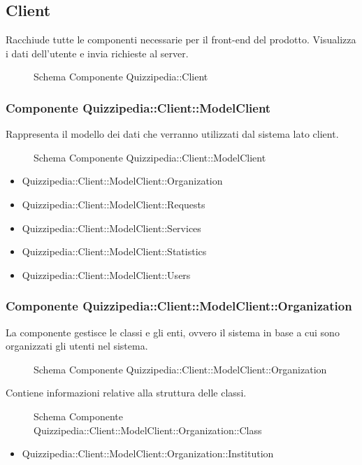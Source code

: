 \subsection{Client}
Racchiude tutte le componenti necessarie per il front-end del prodotto. Visualizza i dati dell'utente e invia richieste al server.
\begin{figure}[H]
\centering
\noindent{}
\caption{Schema Componente Quizzipedia::Client}
\end{figure}
\subsubsection{Componente Quizzipedia::Client::ModelClient}
Rappresenta il modello dei dati che verranno utilizzati dal sistema lato client.
\begin{figure}[H]
\centering
\noindent{}
\caption{Schema Componente Quizzipedia::Client::ModelClient}
\end{figure}
\begin{itemize}
\item Quizzipedia::Client::ModelClient::Organization
\item Quizzipedia::Client::ModelClient::Requests
\item Quizzipedia::Client::ModelClient::Services
\item Quizzipedia::Client::ModelClient::Statistics
\item Quizzipedia::Client::ModelClient::Users
\end{itemize}
\subsubsection{Componente Quizzipedia::Client::ModelClient::Organization}
La componente gestisce le classi e gli enti, ovvero il sistema in base a cui sono organizzati gli utenti nel sistema.
\begin{figure}[H]
\centering
\noindent{}
\caption{Schema Componente Quizzipedia::Client::ModelClient::Organization}
\end{figure}
Contiene informazioni relative alla struttura delle classi.
\begin{figure}[H]
\centering
\noindent{}
\caption{Schema Componente Quizzipedia::Client::ModelClient::Organization::Class}
\end{figure}
\begin{itemize}
\item Quizzipedia::Client::ModelClient::Organization::Institution
\end{itemize}
